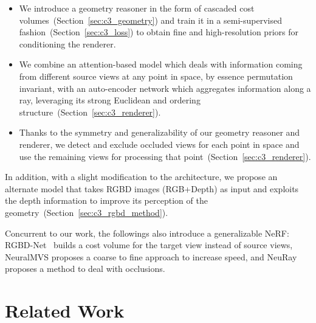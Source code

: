 \begin{itemize}
\item We introduce a geometry reasoner in the form of cascaded cost volumes~(Section~\ref{sec:c3_geometry}) and train it in a semi-supervised fashion~(Section~\ref{sec:c3_loss}) to obtain fine and high-resolution priors for conditioning the renderer.

\item We combine an attention-based model which deals with information coming from different source views at any point in space, by essence permutation invariant, with an auto-encoder network which aggregates information along a ray, leveraging its strong Euclidean and ordering structure~(Section~\ref{sec:c3_renderer}).

\item Thanks to the symmetry and generalizability of our geometry reasoner and renderer, we detect and exclude occluded views for each point in space and use the remaining views for processing that point~(Section~\ref{sec:c3_renderer}). 

\end{itemize}

In addition, with a slight modification to the architecture, we propose an alternate model that takes RGBD images (RGB+Depth) as input and exploits the depth information to improve its perception of the geometry~(Section~\ref{sec:c3_rgbd_method}).

Concurrent to our work, the followings also introduce a generalizable NeRF: RGBD-Net~\citep{nguyen2021rgbd} builds a cost volume for the target view instead of source views, NeuralMVS\citep{rosu2021neuralmvs} proposes a coarse to fine approach to increase speed, and NeuRay~\cite{liu2021neural} proposes a method to deal with occlusions.

\section{Related Work} \label{sec:c3_related}

